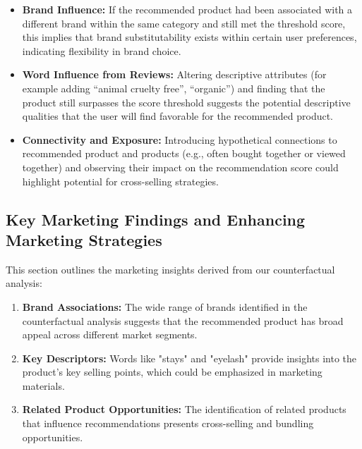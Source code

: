 \begin{itemize}[leftmargin=1cm] %
	\item \textbf{Brand Influence:} If the recommended product had been associated
		with a different brand within the same category and still met the threshold
		score, this implies that brand substitutability exists within certain user preferences,
		indicating flexibility in brand choice.

	\item \textbf{Word Influence from Reviews:} Altering descriptive attributes (for
		example adding “animal cruelty free”, “organic”) and finding that the product
		still surpasses the score threshold suggests the potential descriptive qualities
		that the user will find favorable for the recommended product.

	\item \textbf{Connectivity and Exposure:} Introducing hypothetical connections
		to recommended product and products (e.g., often bought together or viewed together)
		and observing their impact on the recommendation score could highlight
		potential for cross-selling strategies.
\end{itemize}

\subsection{Key Marketing Findings and Enhancing Marketing Strategies}

This section outlines the marketing insights derived from our counterfactual analysis:
\begin{enumerate}
	\item \textbf{Brand Associations:} The wide range of brands identified in the
		counterfactual analysis suggests that the recommended product has broad
		appeal across different market segments.

	\item \textbf{Key Descriptors:} Words like "stays" and "eyelash" provide
		insights into the product's key selling points, which could be emphasized in
		marketing materials.

	\item \textbf{Related Product Opportunities:} The identification of related
		products that influence recommendations presents cross-selling and bundling
		opportunities.
\end{enumerate}

